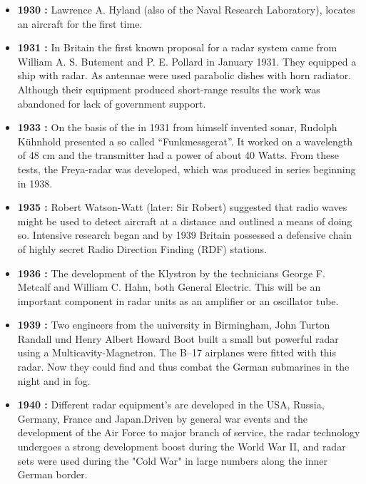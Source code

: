 \documentclass[12pt]{article} %
\begin{document}
\begin{itemize}
\item \textbf {1930 :  }Lawrence A. Hyland (also of the Naval Research Laboratory), locates an aircraft for the first time.

\item \textbf {1931 : }In Britain the first known proposal for a radar system came from William A. S. Butement and P. E. Pollard in January 1931. They equipped a ship with radar. As antennae were used parabolic dishes with horn radiator. Although their equipment produced short-range results the work was abandoned for lack of government support.

\item \textbf {1933 : }On the basis of the in 1931 from himself invented sonar, Rudolph Kühnhold presented a so called “Funkmessgerat”. It worked on a wavelength of 48 cm and the transmitter had a power of about 40 Watts. From these tests, the Freya-radar was developed, which was produced in series beginning in 1938.

\item \textbf {1935 : } Robert Watson-Watt (later: Sir Robert) suggested that radio waves might be used to detect aircraft at a distance and outlined a means of doing so. Intensive research began and by 1939 Britain possessed a defensive chain of highly secret Radio Direction Finding (RDF) stations.

\item \textbf {1936 :} The development of the Klystron by the technicians George F. Metcalf and William C. Hahn, both General Electric. This will be an important component in radar units as an amplifier or an oscillator tube.

\item \textbf {1939 : }Two engineers from the university in Birmingham, John Turton Randall und Henry Albert Howard Boot built a small but powerful radar using a Multicavity-Magnetron. The B–17 airplanes were fitted with this radar. Now they could find and thus combat the German submarines in the night and in fog.

\item \textbf {1940 :} Different radar equipment’s are developed in the USA, Russia, Germany, France and Japan.Driven by general war events and the development of the Air Force to major branch of service, the radar technology undergoes a strong development boost during the World War II, and radar sets were used during the "Cold War" in large numbers along the inner German border.
\end{itemize}
\end{document}
